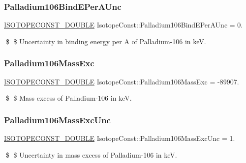 \subsubsection{\texorpdfstring{Palladium106\+Bind\+E\+Per\+A\+Unc}{Palladium106BindEPerAUnc}}
{\footnotesize\ttfamily \mbox{\hyperlink{group___isotope_const-_macros_ga8f45a7272ce02c0b4c65c44636ed719a}{I\+S\+O\+T\+O\+P\+E\+C\+O\+N\+S\+T\+\_\+\+D\+O\+U\+B\+LE}} Isotope\+Const\+::\+Palladium106\+Bind\+E\+Per\+A\+Unc = 0.}

\$ \$ Uncertainty in binding energy per A of Palladium-\/106 in keV. \mbox{\label{group___isotope_const-_palladium-_pd106_ga4603a46b9e6d3c71d1178c02a5b70002}} 
\subsubsection{\texorpdfstring{Palladium106\+Mass\+Exc}{Palladium106MassExc}}
{\footnotesize\ttfamily \mbox{\hyperlink{group___isotope_const-_macros_ga8f45a7272ce02c0b4c65c44636ed719a}{I\+S\+O\+T\+O\+P\+E\+C\+O\+N\+S\+T\+\_\+\+D\+O\+U\+B\+LE}} Isotope\+Const\+::\+Palladium106\+Mass\+Exc = -\/89907.}

\$ \$ Mass excess of Palladium-\/106 in keV. \mbox{\label{group___isotope_const-_palladium-_pd106_ga74fb19bc036f7cfdac9707e777ee86a9}} 
\subsubsection{\texorpdfstring{Palladium106\+Mass\+Exc\+Unc}{Palladium106MassExcUnc}}
{\footnotesize\ttfamily \mbox{\hyperlink{group___isotope_const-_macros_ga8f45a7272ce02c0b4c65c44636ed719a}{I\+S\+O\+T\+O\+P\+E\+C\+O\+N\+S\+T\+\_\+\+D\+O\+U\+B\+LE}} Isotope\+Const\+::\+Palladium106\+Mass\+Exc\+Unc = 1.}

\$ \$ Uncertainty in mass excess of Palladium-\/106 in keV. \mbox{\label{group___isotope_const-_palladium-_pd106_gaa19295ba9f09d0e40575ae2969acb3d3}} 
